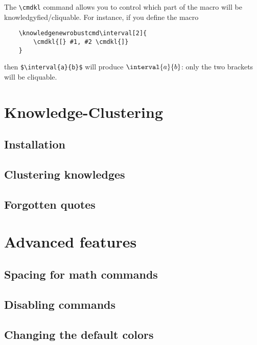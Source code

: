 \documentclass{article}
\begin{document}
The \verb|\cmdkl| command allows you to control which part of the macro will be
knowledgyfied/cliquable. For instance, if you define the macro
\AP{}
\begin{verbatim}
    \knowledgenewrobustcmd\interval[2]{
        \cmdkl{[} #1, #2 \cmdkl{]}
    }
\end{verbatim}
then \verb|$\interval{a}{b}$| will produce $\interval{a}{b}$: only the two
brackets will be cliquable.


\section{Knowledge-Clustering}

\subsection{Installation}

\subsection{Clustering knowledges}

\subsection{Forgotten quotes}


\section{Advanced features}

\subsection{Spacing for math commands}

\subsection{Disabling commands}

\subsection{Changing the default colors}
\end{document}
